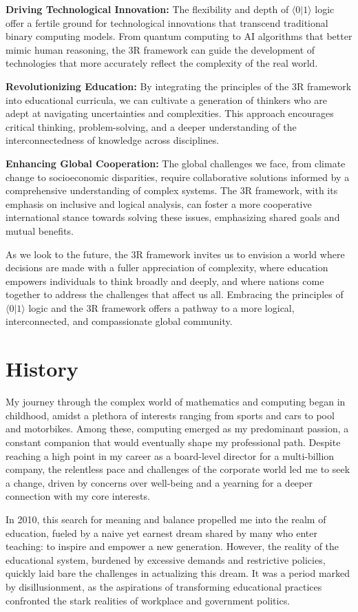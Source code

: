 \documentclass[12pt]{article}
\newcommand{\qbit}{\ensuremath{\langle 0 | 1 \rangle}}
\begin{document}
\textbf{Driving Technological Innovation:} The flexibility and depth of \qbit{} logic offer a fertile ground for technological innovations that transcend traditional binary computing models. From quantum computing to AI algorithms that better mimic human reasoning, the 3R framework can guide the development of technologies that more accurately reflect the complexity of the real world.

\textbf{Revolutionizing Education:} By integrating the principles of the 3R framework into educational curricula, we can cultivate a generation of thinkers who are adept at navigating uncertainties and complexities. This approach encourages critical thinking, problem-solving, and a deeper understanding of the interconnectedness of knowledge across disciplines.

\textbf{Enhancing Global Cooperation:} The global challenges we face, from climate change to socioeconomic disparities, require collaborative solutions informed by a comprehensive understanding of complex systems. The 3R framework, with its emphasis on inclusive and logical analysis, can foster a more cooperative international stance towards solving these issues, emphasizing shared goals and mutual benefits.

As we look to the future, the 3R framework invites us to envision a world where decisions are made with a fuller appreciation of complexity, where education empowers individuals to think broadly and deeply, and where nations come together to address the challenges that affect us all. Embracing the principles of \qbit{} logic and the 3R framework offers a pathway to a more logical, interconnected, and compassionate global community.

\section*{History}
My journey through the complex world of mathematics and computing began in childhood, amidst a plethora of interests ranging from sports and cars to pool and motorbikes. Among these, computing emerged as my predominant passion, a constant companion that would eventually shape my professional path. Despite reaching a high point in my career as a board-level director for a multi-billion company, the relentless pace and challenges of the corporate world led me to seek a change, driven by concerns over well-being and a yearning for a deeper connection with my core interests.

In 2010, this search for meaning and balance propelled me into the realm of education, fueled by a naive yet earnest dream shared by many who enter teaching: to inspire and empower a new generation. However, the reality of the educational system, burdened by excessive demands and restrictive policies, quickly laid bare the challenges in actualizing this dream. It was a period marked by disillusionment, as the aspirations of transforming educational practices confronted the stark realities of workplace and government politics.
\end{document}
